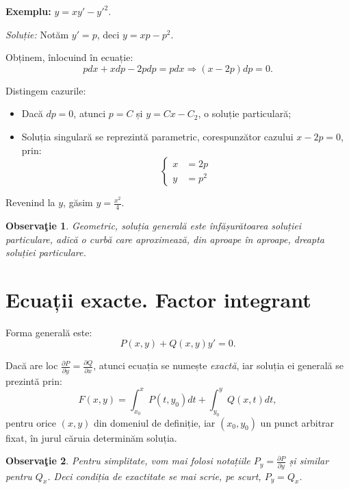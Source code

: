 \documentclass[11pt,a4paper]{article}
\theoremstyle{dotless}
\theoremstyle{dotlessdr}
\newtheorem{remark}{Observa\c{t}ie}[section]
\begin{document}
\vspace{1cm}

\textbf{Exemplu:} $y = xy' - {y'}^2$.

\emph{Soluție:} Notăm $y' = p$, deci $y = xp - p^2$.

Obținem, înlocuind în ecuație:
\[
  pdx + xdp - 2pdp = pdx \Rightarrow (x - 2p) dp = 0.
\]

Distingem cazurile:
\begin{itemize}
\item Dacă $dp = 0$, atunci $p = C$ și $y = Cx - C_2$, o soluție particulară;
\item Soluția singulară se reprezintă parametric, corespunzător cazului $x - 2p = 0$, prin:
  \[
    \begin{cases}
      x &= 2p \\
      y &= p^2
    \end{cases}
  \]
\end{itemize}

Revenind la $y$, găsim $y = \frac{x^2}{4}$.

\begin{remark}\label{rk:infas}
  Geometric, soluția generală este \emph{înfășurătoarea} soluției particulare, adică o curbă
  care aproximează, din aproape în aproape, dreapta soluției particulare.
\end{remark}


\section{Ecuații exacte. Factor integrant}
\label{sec:exc-int}

Forma generală este:
\[
  P(x, y) + Q(x, y) y' = 0.
\]

Dacă are loc $\frac{\partial P}{\partial y} = \frac{\partial Q}{\partial x}$, atunci
ecuația se numește \emph{exactă}, iar soluția ei generală se prezintă prin:
\[
  F(x, y) = \int_{x_0}^x P(t, y_0) dt + \int_{y_0}^y Q(x, t) dt,
\]
pentru orice $(x, y)$ din domeniul de definiție, iar $(x_0, y_0)$ un punct arbitrar fixat,
în jurul căruia determinăm soluția.

\begin{remark}\label{rk:partial}
  Pentru simplitate, vom mai folosi notațiile $P_y = \frac{\partial P}{\partial y}$ și
  similar pentru $Q_x$. Deci condiția de exactitate se mai scrie, pe scurt, $P_y = Q_x$.
\end{remark}
\end{document}
